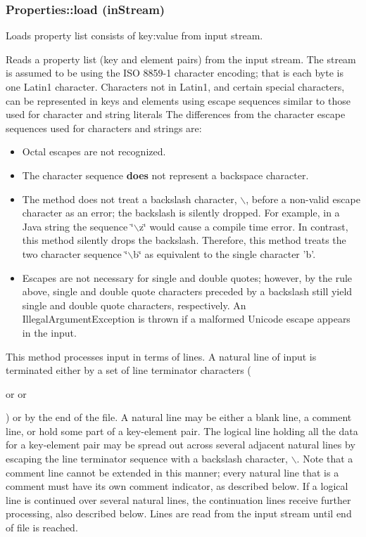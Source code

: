 \subsubsection{\setlength{\rightskip}{0pt plus 5cm}Properties::load (in\-Stream)}\label{classProperties_Propertiesa14}


Loads property list consists of key:value from input stream. 

Reads a property list (key and element pairs) from the input stream. The stream is assumed to be using the ISO 8859-1 character encoding; that is each byte is one Latin1 character. Characters not in Latin1, and certain special characters, can be represented in keys and elements using escape sequences similar to those used for character and string literals The differences from the character escape sequences used for characters and strings are:\begin{itemize}
\item Octal escapes are not recognized.\item The character sequence {\bf does} not represent a backspace character.\item The method does not treat a backslash character, $\backslash$, before a non-valid escape character as an error; the backslash is silently dropped. For example, in a Java string the sequence \char`\"{}$\backslash$z\char`\"{} would cause a compile time error. In contrast, this method silently drops the backslash. Therefore, this method treats the two character sequence \char`\"{}$\backslash$b\char`\"{} as equivalent to the single character 'b'.\item Escapes are not necessary for single and double quotes; however, by the rule above, single and double quote characters preceded by a backslash still yield single and double quote characters, respectively. An Illegal\-Argument\-Exception is thrown if a malformed Unicode escape appears in the input.\end{itemize}


This method processes input in terms of lines. A natural line of input is terminated either by a set of line terminator characters (\par
 or  or \par
) or by the end of the file. A natural line may be either a blank line, a comment line, or hold some part of a key-element pair. The logical line holding all the data for a key-element pair may be spread out across several adjacent natural lines by escaping the line terminator sequence with a backslash character, $\backslash$. Note that a comment line cannot be extended in this manner; every natural line that is a comment must have its own comment indicator, as described below. If a logical line is continued over several natural lines, the continuation lines receive further processing, also described below. Lines are read from the input stream until end of file is reached.

